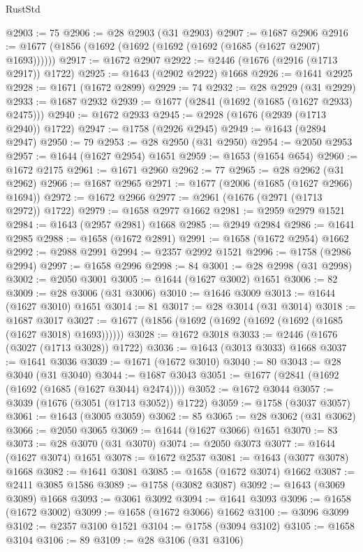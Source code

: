 \begin{lexlean}{RustStd}
\begin{coremodule}
@2903 := 75
@2906 := @28 @2903 (@31 @2903)
@2907 := @1687 @2906
@2916 := @1677 (@1856 (@1692 (@1692 (@1692 (@1692 (@1685 (@1627 @2907) @1693))))))
@2917 := @1672 @2907
@2922 := @2446 (@1676 (@2916 (@1713 @2917)) @1722)
@2925 := @1643 (@2902 @2922) @1668
@2926 := @1641 @2925
@2928 := @1671 (@1672 @2899)
@2929 := 74
@2932 := @28 @2929 (@31 @2929)
@2933 := @1687 @2932
@2939 := @1677 (@2841 (@1692 (@1685 (@1627 @2933) @2475)))
@2940 := @1672 @2933
@2945 := @2928 (@1676 (@2939 (@1713 @2940)) @1722)
@2947 := @1758 (@2926 @2945)
@2949 := @1643 (@2894 @2947)
@2950 := 79
@2953 := @28 @2950 (@31 @2950)
@2954 := @2050 @2953
@2957 := @1644 (@1627 @2954) @1651
@2959 := @1653 (@1654 @654)
@2960 := @1672 @2175
@2961 := @1671 @2960
@2962 := 77
@2965 := @28 @2962 (@31 @2962)
@2966 := @1687 @2965
@2971 := @1677 (@2006 (@1685 (@1627 @2966) @1694))
@2972 := @1672 @2966
@2977 := @2961 (@1676 (@2971 (@1713 @2972)) @1722)
@2979 := @1658 @2977 @1662
@2981 := @2959 @2979 @1521
@2984 := @1643 (@2957 @2981) @1668
@2985 := @2949 @2984
@2986 := @1641 @2985
@2988 := @1658 (@1672 @2891)
@2991 := @1658 (@1672 @2954) @1662
@2992 := @2988 @2991
@2994 := @2357 @2992 @1521
@2996 := @1758 (@2986 @2994)
@2997 := @1658 @2996
@2998 := 84
@3001 := @28 @2998 (@31 @2998)
@3002 := @2050 @3001
@3005 := @1644 (@1627 @3002) @1651
@3006 := 82
@3009 := @28 @3006 (@31 @3006)
@3010 := @1646 @3009
@3013 := @1644 (@1627 @3010) @1651
@3014 := 81
@3017 := @28 @3014 (@31 @3014)
@3018 := @1687 @3017
@3027 := @1677 (@1856 (@1692 (@1692 (@1692 (@1692 (@1685 (@1627 @3018) @1693))))))
@3028 := @1672 @3018
@3033 := @2446 (@1676 (@3027 (@1713 @3028)) @1722)
@3036 := @1643 (@3013 @3033) @1668
@3037 := @1641 @3036
@3039 := @1671 (@1672 @3010)
@3040 := 80
@3043 := @28 @3040 (@31 @3040)
@3044 := @1687 @3043
@3051 := @1677 (@2841 (@1692 (@1692 (@1685 (@1627 @3044) @2474))))
@3052 := @1672 @3044
@3057 := @3039 (@1676 (@3051 (@1713 @3052)) @1722)
@3059 := @1758 (@3037 @3057)
@3061 := @1643 (@3005 @3059)
@3062 := 85
@3065 := @28 @3062 (@31 @3062)
@3066 := @2050 @3065
@3069 := @1644 (@1627 @3066) @1651
@3070 := 83
@3073 := @28 @3070 (@31 @3070)
@3074 := @2050 @3073
@3077 := @1644 (@1627 @3074) @1651
@3078 := @1672 @2537
@3081 := @1643 (@3077 @3078) @1668
@3082 := @1641 @3081
@3085 := @1658 (@1672 @3074) @1662
@3087 := @2411 @3085 @1586
@3089 := @1758 (@3082 @3087)
@3092 := @1643 (@3069 @3089) @1668
@3093 := @3061 @3092
@3094 := @1641 @3093
@3096 := @1658 (@1672 @3002)
@3099 := @1658 (@1672 @3066) @1662
@3100 := @3096 @3099
@3102 := @2357 @3100 @1521
@3104 := @1758 (@3094 @3102)
@3105 := @1658 @3104
@3106 := 89
@3109 := @28 @3106 (@31 @3106)

\end{coremodule}
\end{lexlean}
